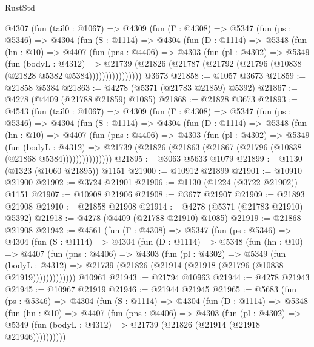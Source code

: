 \begin{lexlean}{RustStd}
\begin{coremodule}
{\begin{coremodule}
{{{{{{{{{{{{{{{{{{{{{{{{{{{{{{{{{{{    @4307
      (fun (tail0 : @1067) =>
      @4309
        (fun (Γ : @4308) =>
        @5347
          (fun (ps : @5346) =>
          @4304
            (fun (S : @1114) =>
            @4304
              (fun (D : @1114) =>
              @5348
                (fun (hn : @10) =>
                @4407
                  (fun (pns : @4406) =>
                  @4303
                    (fun (pl : @4302) =>
                    @5349
                      (fun (bodyL : @4312) =>
                      @21739
                        (@21826 (@21787 (@21792 (@21796 (@10838 (@21828 @5382 @5384))))))))))))))))
    @3673
@21858 := @1057 @3673
@21859 := @21858 @5384
@21863 := @4278 (@5371 (@21783 @21859) @5392)
@21867 := @4278 (@4409 (@21788 @21859) @1085)
@21868 := @21828 @3673
@21893 := @4543
    (fun (tail0 : @1067) =>
    @4309
      (fun (Γ : @4308) =>
      @5347
        (fun (ps : @5346) =>
        @4304
          (fun (S : @1114) =>
          @4304
            (fun (D : @1114) =>
            @5348
              (fun (hn : @10) =>
              @4407
                (fun (pns : @4406) =>
                @4303
                  (fun (pl : @4302) =>
                  @5349
                    (fun (bodyL : @4312) =>
                    @21739 (@21826 (@21863 (@21867 (@21796 (@10838 (@21868 @5384)))))))))))))))
@21895 := @3063 @5633 @1079
@21899 := @1130 (@1323 (@1060 @21895)) @1151
@21900 := @10912 @21899
@21901 := @10910 @21900
@21902 := @3724 @21901
@21906 := @1130 (@1224 (@3722 @21902)) @1151
@21907 := @10908 @21906
@21908 := @3677 @21907
@21909 := @21893 @21908
@21910 := @21858 @21908
@21914 := @4278 (@5371 (@21783 @21910) @5392)
@21918 := @4278 (@4409 (@21788 @21910) @1085)
@21919 := @21868 @21908
@21942 := @4561
    (fun (Γ : @4308) =>
    @5347
      (fun (ps : @5346) =>
      @4304
        (fun (S : @1114) =>
        @4304
          (fun (D : @1114) =>
          @5348
            (fun (hn : @10) =>
            @4407
              (fun (pns : @4406) =>
              @4303
                (fun (pl : @4302) =>
                @5349
                  (fun (bodyL : @4312) =>
                  @21739 (@21826 (@21914 (@21918 (@21796 (@10838 @21919)))))))))))))
    @10961
@21943 := @21794 @10963
@21944 := @4278 @21943
@21945 := @10967 @21919
@21946 := @21944 @21945
@21965 := @5683
    (fun (ps : @5346) =>
    @4304
      (fun (S : @1114) =>
      @4304
        (fun (D : @1114) =>
        @5348
          (fun (hn : @10) =>
          @4407
            (fun (pns : @4406) =>
            @4303
              (fun (pl : @4302) =>
              @5349 (fun (bodyL : @4312) => @21739 (@21826 (@21914 (@21918 @21946))))))))))
}}}}}}}}}}}}}}}}}}}}}}}}}}}}}}}}}}}
\end{coremodule}}
\end{coremodule}
\end{lexlean}
